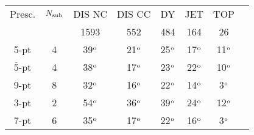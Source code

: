 \renewcommand*{\arraystretch}{1.20}
\begin{tabular}{|c|c|c|c|c|c|c|c|}
 \toprule
Presc. & $N_{\rm sub}$ & DIS NC & DIS CC & DY & JET & TOP \\
\cline{3-7}
& & 1593 & 552 & 484 & 164 & 26 \\
\hline
 5-pt & 4 &39$^{\rm o}$ & 21$^{\rm o}$ & 25$^{\rm o}$ & 17$^{\rm o}$ & 11$^{\rm o}$	\\
$\overline{5}$-pt & 4 & 38$^{\rm o}$ & 17$^{\rm o}$ & 23$^{\rm o}$	& 22$^{\rm o}$ & 10$^{\rm o}$ \\
9-pt & 8 & 32$^{\rm o}$ & 16$^{\rm o}$ & 22$^{\rm o}$ & 14$^{\rm o}$ & 3$^{\rm o}$	\\
\hline
 3-pt & 2 &54$^{\rm o}$ & 36$^{\rm o}$ & 39$^{\rm o}$ & 24$^{\rm o}$ & 12$^{\rm o}$ \\
7-pt & 6 &35$^{\rm o}$ & 17$^{\rm o}$ & 22$^{\rm o}$ & 16$^{\rm o}$ & 3$^{\rm o}$	\\
    \bottomrule
\end{tabular}
